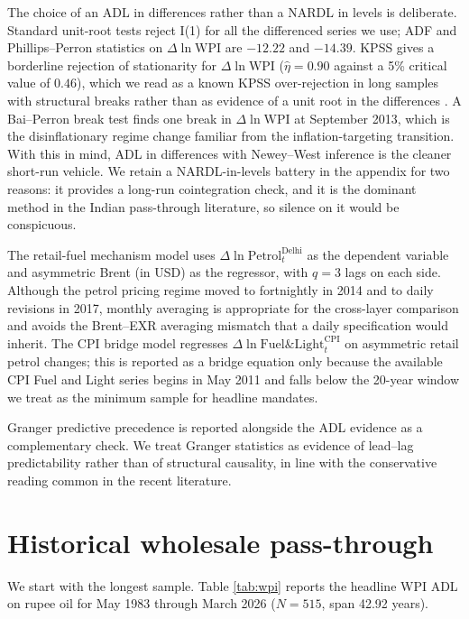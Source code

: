 \documentclass[11pt,a4paper]{article}
\begin{document}
The choice of an ADL in differences rather than a NARDL in levels is deliberate. Standard unit-root tests reject I(1) for all the differenced series we use; ADF and Phillips--Perron statistics on $\Delta \ln \mathrm{WPI}$ are $-12.22$ and $-14.39$. KPSS gives a borderline rejection of stationarity for $\Delta \ln \mathrm{WPI}$ ($\hat\eta = 0.90$ against a 5\% critical value of $0.46$), which we read as a known KPSS over-rejection in long samples with structural breaks rather than as evidence of a unit root in the differences \citep[see][]{rbi2014}. A Bai--Perron break test finds one break in $\Delta \ln \mathrm{WPI}$ at September 2013, which is the disinflationary regime change familiar from the inflation-targeting transition. With this in mind, ADL in differences with Newey--West inference is the cleaner short-run vehicle. We retain a NARDL-in-levels battery in the appendix for two reasons: it provides a long-run cointegration check, and it is the dominant method in the Indian pass-through literature, so silence on it would be conspicuous.

The retail-fuel mechanism model uses $\Delta \ln \mathrm{Petrol}_t^{\text{Delhi}}$ as the dependent variable and asymmetric Brent (in USD) as the regressor, with $q = 3$ lags on each side. Although the petrol pricing regime moved to fortnightly in 2014 and to daily revisions in 2017, monthly averaging is appropriate for the cross-layer comparison and avoids the Brent--EXR averaging mismatch that a daily specification would inherit. The CPI bridge model regresses $\Delta \ln \mathrm{Fuel\&Light}^{\text{CPI}}_t$ on asymmetric retail petrol changes; this is reported as a bridge equation only because the available CPI Fuel and Light series begins in May 2011 and falls below the 20-year window we treat as the minimum sample for headline mandates.

Granger predictive precedence is reported alongside the ADL evidence as a complementary check. We treat Granger statistics as evidence of lead--lag predictability rather than of structural causality, in line with the conservative reading common in the recent literature.

\section{Historical wholesale pass-through}
\label{sec:wpi}

We start with the longest sample. Table \ref{tab:wpi} reports the headline WPI ADL on rupee oil for May 1983 through March 2026 ($N=515$, span 42.92 years).
\end{document}
